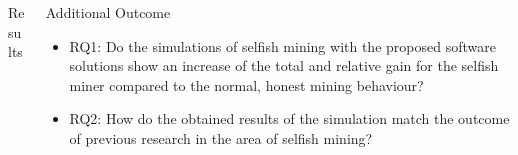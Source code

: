 \documentclass[final,hyperref={pdfpagelabels=true}]{beamer}
\begin{document}
\begin{frame}
\begin{columns}[t]
\begin{column}{.55\textwidth}
\begin{block}{Results}
\begin{columns}[t]
  		\end{columns}
  		
      \end{block}  

		\lipsum[66]      
          
    \end{column}

    \begin{column}{.35\textwidth}
    
      \begin{block}{Additional Outcome}
      	\begin{itemize}
     		\item RQ1: Do the simulations of selfish mining with the proposed software solutions
show an increase of the total and relative gain for the selfish miner compared to
the normal, honest mining behaviour?
			\item RQ2: How do the obtained results of the simulation match the outcome of previous
research in the area of selfish mining?
      	\end{itemize}
      \end{block}

    \end{column}

  \end{columns}

\end{frame}
\end{document}
